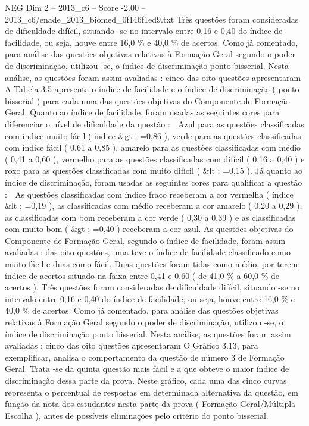 \begin{textsample}{NEG Dim 2 – 2013\_c6 – Score -2.00 – 2013\_c6/enade\_2013\_biomed\_0f146f1ed9.txt}
Três questões foram consideradas de dificuldade difícil, situando -se no intervalo entre 0,16 e 0,40 do índice de facilidade, ou seja, houve entre 16,0 \% e 40,0 \% de acertos.
Como já comentado, para análise das questões objetivas relativas à Formação Geral segundo o poder de discriminação, utilizou -se, o índice de discriminação ponto bisserial.
Nesta análise, as questões foram assim avaliadas : cinco das oito questões apresentaram A Tabela 3.5 apresenta o índice de facilidade e o índice de discriminação ( ponto bisserial ) para cada uma das questões objetivas do Componente de Formação Geral.
Quanto ao índice de facilidade, foram usadas as seguintes cores para diferenciar o nível de dificuldade da questão :  Azul para as questões classificadas com índice muito fácil ( índice \&gt ; =0,86 ), verde para as questões classificadas com índice fácil ( 0,61 a 0,85 ), amarelo para as questões classificadas com médio ( 0,41 a 0,60 ), vermelho para as questões classificadas com difícil ( 0,16 a 0,40 ) e roxo para as questões classificadas com muito difícil ( \&lt ; =0,15 ).
Já quanto ao índice de discriminação, foram usadas as seguintes cores para qualificar a questão :  As questões classificadas com índice fraco receberam a cor vermelha ( índice \&lt ; =0,19 ), as classificadas com médio receberam a cor amarelo ( 0,20 a 0,29 ), as classificadas com bom receberam a cor verde ( 0,30 a 0,39 ) e as classificadas com muito bom ( \&gt ; =0,40 ) receberam a cor azul.
As questões objetivas do Componente de Formação Geral, segundo o índice de facilidade, foram assim avaliadas : das oito questões, uma teve o índice de facilidade classificado como muito fácil e duas como fácil.
Duas questões foram tidas como médio, por terem índice de acertos situado na faixa entre 0,41 e 0,60 ( de 41,0 \% a 60,0 \% de acertos ).
Três questões foram consideradas de dificuldade difícil, situando -se no intervalo entre 0,16 e 0,40 do índice de facilidade, ou seja, houve entre 16,0 \% e 40,0 \% de acertos.
Como já comentado, para análise das questões objetivas relativas à Formação Geral segundo o poder de discriminação, utilizou -se, o índice de discriminação ponto bisserial.
Nesta análise, as questões foram assim avaliadas : cinco das oito questões apresentaram O Gráfico 3.13, para exemplificar, analisa o comportamento da questão de número 3 de Formação Geral.
Trata -se da quinta questão mais fácil e a que obteve o maior índice de discriminação dessa parte da prova.
Neste gráfico, cada uma das cinco curvas representa o percentual de respostas em determinada alternativa da questão, em função da nota dos estudantes nesta parte da prova ( Formação Geral/Múltipla Escolha ), antes de possíveis eliminações pelo critério do ponto bisserial.

\end{textsample}
